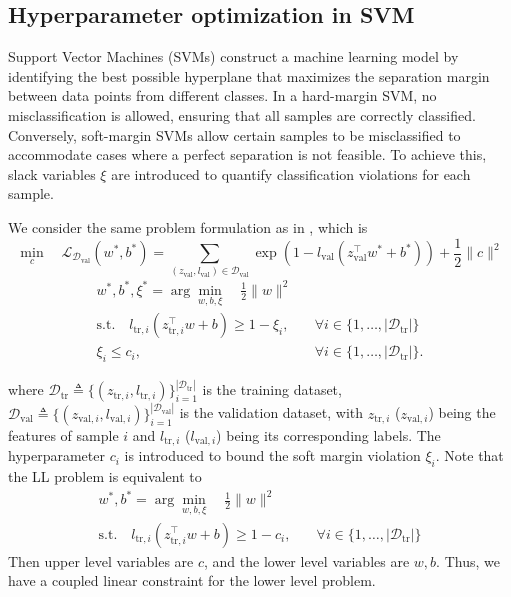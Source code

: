 \documentclass{article}
\theoremstyle{plain}
\theoremstyle{definition}
\theoremstyle{remark}
\begin{document}
\subsection{Hyperparameter optimization in SVM}

Support Vector Machines (SVMs) construct a machine learning model by identifying the best possible hyperplane that maximizes the separation margin between data points from different classes. In a hard-margin SVM, no misclassification is allowed, ensuring that all samples are correctly classified. Conversely, soft-margin SVMs allow certain samples to be misclassified to accommodate cases where a perfect separation is not feasible. To achieve this, slack variables $\xi$
are introduced to quantify classification violations for each sample. 

We consider the same problem formulation as in \cite{jiang2024primal}, which is
\[
\min_{c} \quad \mathcal{L}_{\mathcal{D}_\text{val}}(w^*, b^*) = \sum_{(z_\text{val}, l_\text{val}) \in \mathcal{D}_\text{val}} \exp \left( 1 - l_\text{val} \left( z_\text{val}^\top w^* + b^* \right) \right) + \frac{1}{2} \|c\|^2
\]
\begin{align*}
w^*, b^*, \xi^* = \arg\min_{w,b,\xi} \quad \frac{1}{2} \|w\|^2\\
\text{s.t.} \quad l_{\text{tr},i} (z_{\text{tr},i}^\top w + b) \geq 1 - \xi_i, \quad &\forall i \in \{1, \dots, |\mathcal{D}_\text{tr}|\}\\
\xi_i \leq c_i, \quad &\forall i \in \{1, \dots, |\mathcal{D}_\text{tr}|\}.
\end{align*}

where $\mathcal{D}_\text{tr}\triangleq\{(z_{\text{tr},i}, l_{\text{tr},i})\}_{i=1}^{|\mathcal{D}_\text{tr}|}$ is the training dataset, $\mathcal{D}_\text{val}\triangleq\{(z_{\text{val},i}, l_{\text{val},i})\}_{i=1}^{|\mathcal{D}_\text{val}|}$ is the validation dataset,  with $z_{\text{tr},i}$ ($z_{\text{val},i}$) being the features of sample $i$ and $l_{\text{tr},i}$ ($l_{\text{val},i}$) being its corresponding labels. The hyperparameter $c_i$ is introduced to bound the soft margin violation $\xi_i$.
Note that the LL problem is equivalent to
\begin{align*}
w^*, b^* = \arg\min_{w,b,\xi} \quad \frac{1}{2} \|w\|^2\\
\text{s.t.} \quad l_{\text{tr},i} (z_{\text{tr},i}^\top w + b) \geq 1 - c_i, \quad &\forall i \in \{1, \dots, |\mathcal{D}_\text{tr}|\}
\end{align*}
Then upper level variables are $c$, and the lower level variables are $w, b$. Thus, we have a coupled linear constraint for the lower level problem.
\end{document}
